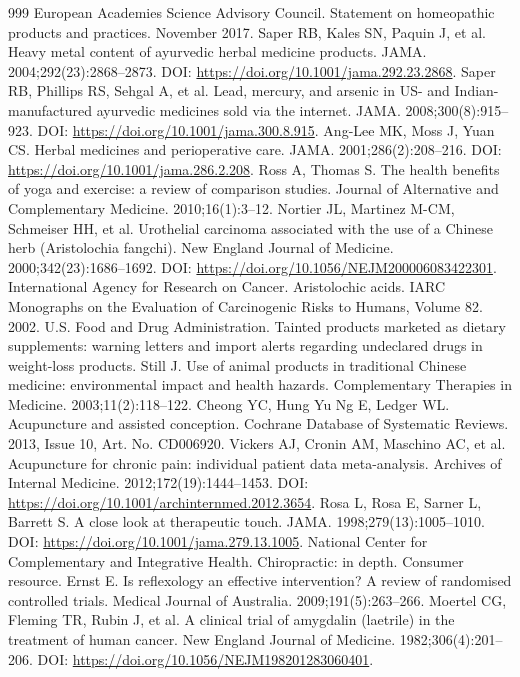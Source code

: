 \documentclass[11pt,oneside]{book}
\begin{document}
\begin{thebibliography}{999}
European Academies Science Advisory Council. Statement on homeopathic products and practices. November 2017.
Saper RB, Kales SN, Paquin J, et al. Heavy metal content of ayurvedic herbal medicine products. JAMA. 2004;292(23):2868--2873. DOI: \url{https://doi.org/10.1001/jama.292.23.2868}.
Saper RB, Phillips RS, Sehgal A, et al. Lead, mercury, and arsenic in US- and Indian-manufactured ayurvedic medicines sold via the internet. JAMA. 2008;300(8):915--923. DOI: \url{https://doi.org/10.1001/jama.300.8.915}.
Ang-Lee MK, Moss J, Yuan CS. Herbal medicines and perioperative care. JAMA. 2001;286(2):208--216. DOI: \url{https://doi.org/10.1001/jama.286.2.208}.
Ross A, Thomas S. The health benefits of yoga and exercise: a review of comparison studies. Journal of Alternative and Complementary Medicine. 2010;16(1):3--12.
Nortier JL, Martinez M-CM, Schmeiser HH, et al. Urothelial carcinoma associated with the use of a Chinese herb (Aristolochia fangchi). New England Journal of Medicine. 2000;342(23):1686--1692. DOI: \url{https://doi.org/10.1056/NEJM200006083422301}.
International Agency for Research on Cancer. Aristolochic acids. IARC Monographs on the Evaluation of Carcinogenic Risks to Humans, Volume 82. 2002.
U.S. Food and Drug Administration. Tainted products marketed as dietary supplements: warning letters and import alerts regarding undeclared drugs in weight-loss products.
Still J. Use of animal products in traditional Chinese medicine: environmental impact and health hazards. Complementary Therapies in Medicine. 2003;11(2):118--122.
Cheong YC, Hung Yu Ng E, Ledger WL. Acupuncture and assisted conception. Cochrane Database of Systematic Reviews. 2013, Issue 10, Art. No. CD006920.
Vickers AJ, Cronin AM, Maschino AC, et al. Acupuncture for chronic pain: individual patient data meta-analysis. Archives of Internal Medicine. 2012;172(19):1444--1453. DOI: \url{https://doi.org/10.1001/archinternmed.2012.3654}.
Rosa L, Rosa E, Sarner L, Barrett S. A close look at therapeutic touch. JAMA. 1998;279(13):1005--1010. DOI: \url{https://doi.org/10.1001/jama.279.13.1005}.
National Center for Complementary and Integrative Health. Chiropractic: in depth. Consumer resource.
Ernst E. Is reflexology an effective intervention? A review of randomised controlled trials. Medical Journal of Australia. 2009;191(5):263--266.
Moertel CG, Fleming TR, Rubin J, et al. A clinical trial of amygdalin (laetrile) in the treatment of human cancer. New England Journal of Medicine. 1982;306(4):201--206. DOI: \url{https://doi.org/10.1056/NEJM198201283060401}.

\end{thebibliography}
\end{document}
